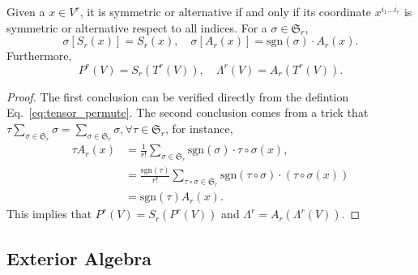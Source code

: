 \begin{theorem}
Given a $x\in V^r$, it is symmetric or alternative if and only if its coordinate $x^{i_1\dots i_r}$ is symmetric or alternative respect to all indices. For a $\sigma\in \mathfrak{S}_r$, 
\begin{equation}
\sigma[S_r(x)]=S_r(x),\quad \sigma[A_r(x)]=\text{sgn}(\sigma)\cdot A_r(x).
\end{equation}
Furthermore, 
\begin{equation}
P^r(V)=S_r(T^r(V)),\quad \Lambda^r(V)=A_r(T^r(V)).
\end{equation} 
\end{theorem}
\begin{proof}
The first conclusion can be verified directly from the defintion Eq.~\ref{eq:tensor_permute}. The second conclusion comes from a trick that $\tau\sum_{\sigma\in\mathfrak{S}_r}\sigma=\sum_{\sigma\in\mathfrak{S}_r}\sigma,\forall \tau\in\mathfrak{S}_r$, for instance, 
\begin{equation*}
\begin{aligned}
\tau A_r(x)&=\frac{1}{r!}\sum_{\sigma\in\mathfrak{S}_r}\text{sgn}(\sigma)\cdot\tau\circ\sigma(x),\\
&=\frac{\text{sgn}(\tau)}{r!}\sum_{\tau\circ\sigma\in\mathfrak{S}_r}\text{sgn}(\tau\circ\sigma)\cdot(\tau\circ\sigma(x))\\
&=\text{sgn}(\tau)A_r(x).
\end{aligned}
\end{equation*}
This implies that $P^r(V)=S_r(P^r(V))$ and $\Lambda^r=A_r(\Lambda^r(V))$.
\end{proof}

\subsection{Exterior Algebra}


